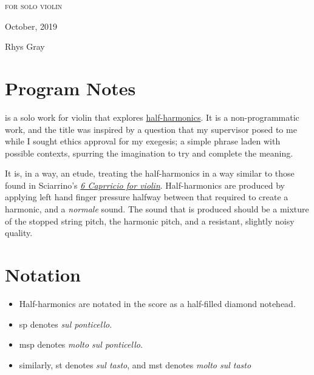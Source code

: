 \newpage

\invisiblechapter{\violinPiece}


\vspace*{3cm}
\begin{center}
\textsc{for solo violin}
\vspace*{3.5cm}

\HRule{0.5pt}


\LARGE \textbf{\uppercase{\violinPiece}}
\HRule{2pt}

\vspace{1.3cm}

\normalsize October, 2019
\date{}

\vspace*{5\baselineskip}

Rhys Gray

\end{center}
\newpage
\section*{Program Notes}
\violinPiece\space is a solo work for violin that explores \hyperref[sec:half-harmonics]{half-harmonics}.
It is a non-programmatic work, and the title was inspired by a question that my supervisor posed to me while I sought ethics approval for my exegesis; a simple phrase laden with possible contexts, spurring the imagination to try and complete the meaning.

It is, in a way, an etude, treating the half-harmonics in a way similar to those found in Sciarrino's \hyperref[fig:sciarrinoExcerpt]{\emph{6 Caprricio for violin}}. 
Half-harmonics are produced by applying left hand finger pressure halfway between that required to create a harmonic, and a \emph{normale} sound. 
The sound that is produced should be a mixture of the stopped string pitch, the harmonic pitch, and a resistant, slightly noisy quality.

\section*{Notation}
\begin{itemize}

    \item Half-harmonics are notated in the score as a half-filled diamond notehead.
    \item sp denotes \emph{sul ponticello}.
    \item msp denotes \emph{molto sul ponticello}.
    \item similarly, st denotes \emph{sul tasto}, and mst denotes \emph{molto sul tasto}
\end{itemize}

\newpage\label{violinPiece}
